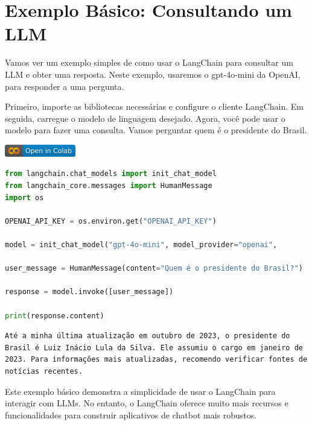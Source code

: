 \documentclass[14pt,a4paper,oneside]{book}
\begin{document}
\section{Exemplo Básico: Consultando um LLM}

Vamos ver um exemplo simples de como usar o LangChain para consultar um LLM e obter uma resposta. Neste exemplo, usaremos o gpt-4o-mini da OpenAI, para responder a uma pergunta.

Primeiro, importe as bibliotecas necessárias e configure o cliente LangChain. Em seguida, carregue o modelo de linguagem desejado. Agora, você pode usar o modelo para fazer uma consulta. Vamos perguntar quem é o presidente do Brasil.

\vspace{\baselineskip}
\href{https://colab.research.google.com/github/giseldo/chatbotbook/blob/main/notebook/cap9.ipynb}{
  \includegraphics{./fig/colab-badge.png}
}

\begin{lstlisting}[language=Python, caption=Exemplo de uso do LangChain]
from langchain.chat_models import init_chat_model
from langchain_core.messages import HumanMessage
import os

OPENAI_API_KEY = os.environ.get("OPENAI_API_KEY")

model = init_chat_model("gpt-4o-mini", model_provider="openai", 						openai_api_key=OPENAI_API_KEY)

user_message = HumanMessage(content="Quem é o presidente do Brasil?")

response = model.invoke([user_message])

print(response.content)
\end{lstlisting}

\begin{lstlisting}
Até a minha última atualização em outubro de 2023, o presidente do Brasil é Luiz Inácio Lula da Silva. Ele assumiu o cargo em janeiro de 2023. Para informações mais atualizadas, recomendo verificar fontes de notícias recentes.
\end{lstlisting}

Este exemplo básico demonstra a simplicidade de usar o LangChain para interagir com LLMs. No entanto, o LangChain oferece muito mais recursos e funcionalidades para construir aplicativos de chatbot mais robustos.

\end{document}
